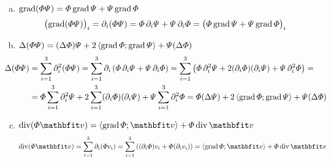 \documentclass{szb-solution}
\begin{document}
\begin{enumerate}[a)]
  \item $\operatorname{grad} (\varPhi \varPsi) = \varPhi \operatorname{grad} \varPsi + \varPsi \operatorname{grad} \varPhi$
        $$
          \bigl(\operatorname{grad}(\varPhi\varPsi)\bigr)_i
          = \partial_i(\varPhi\varPsi)
          = \varPhi\,\partial_i\varPsi+\varPsi\,\partial_i\varPhi
          = \bigl(\varPhi\operatorname{grad}\varPsi+\varPsi\operatorname{grad}\varPhi\bigr)_i
        $$

  \item $\Delta (\varPhi \varPsi) = (\Delta \varPhi) \varPsi + 2 \left\langle\operatorname{grad} \varPhi;\operatorname{grad} \varPsi\right\rangle + \varPsi (\Delta \varPhi)$
        \begin{align*}
          \hspace{-17.5pt}
          \Delta (\varPhi \varPsi)
           & = \sum_{i = 1}^3\partial_i^2 (\varPhi \varPsi)
          = \sum_{i = 1}^3 \partial_i \left( \varPhi \, \partial_i \varPsi + \varPsi \, \partial_i \varPhi \right)
          = \sum_{i = 1}^3 \left( \varPhi \, \partial_i^2 \varPsi + 2 (\partial_i \varPhi) (\partial_i \varPsi) + \varPsi \, \partial_i^2 \varPhi \right)
          =
          \\
           & = \varPhi \sum_{i = 1}^3 \partial_i^2 \varPsi + 2 \sum_{i = 1}^3 (\partial_i \varPhi) (\partial_i \varPsi) + \varPsi \sum_{i = 1}^3 \partial_i^2 \varPhi
          = \varPhi (\Delta \varPsi) + 2 \scalar{\grad \varPhi}{\grad \varPsi} + \varPsi (\Delta \varPhi)
        \end{align*}

  \item $\Div (\varPhi \rvec v) = \scalar{\grad \varPhi}{\rvec v} + \varPhi \Div \rvec v$
        $$
          \Div (\varPhi \rvec v)
          = \sum_{i = 1}^3 \partial_i (\varPhi v_i)
          = \sum_{i = 1}^3 \left( (\partial_i \varPhi) v_i + \varPhi (\partial_i v_i) \right)
          = \scalar{\grad \varPhi}{\rvec v} + \varPhi \Div \rvec v
        $$


\end{enumerate}
\end{document}
